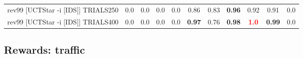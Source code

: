\documentclass{article}
\begin{document}
\begin{tabular}{|l|r@{$\pm$}rr@{$\pm$}rr@{$\pm$}rr@{$\pm$}rr@{$\pm$}rr@{$\pm$}rr@{$\pm$}rr@{$\pm$}rr@{$\pm$}rr@{$\pm$}r|}
\\
rev99 [UCTStar -i [IDS]] TRIALS250
& \multicolumn{2}{c}{0.0}
& \multicolumn{2}{c}{0.0}
& \multicolumn{2}{c}{0.0}
& \multicolumn{2}{c}{0.0}
& \multicolumn{2}{c}{0.86}
& \multicolumn{2}{c}{0.83}
& \multicolumn{2}{c}{\textbf{0.96}}
& \multicolumn{2}{c}{0.92}
& \multicolumn{2}{c}{0.91}
& \multicolumn{2}{c|}{0.0}
\\
rev99 [UCTStar -i [IDS]] TRIALS400
& \multicolumn{2}{c}{0.0}
& \multicolumn{2}{c}{0.0}
& \multicolumn{2}{c}{0.0}
& \multicolumn{2}{c}{0.0}
& \multicolumn{2}{c}{\textbf{0.97}}
& \multicolumn{2}{c}{0.76}
& \multicolumn{2}{c}{\textbf{0.98}}
& \multicolumn{2}{c}{\textbf{\textcolor{red}{1.0}}}
& \multicolumn{2}{c}{\textbf{0.99}}
& \multicolumn{2}{c|}{0.0}
\\
\hline
\end{tabular}%

\bigskip

\subsection*{Rewards: traffic}
\end{document}

